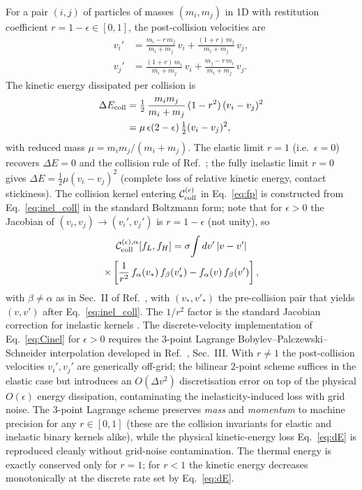 \documentclass[aps,pre,twocolumn,superscriptaddress,longbibliography,floatfix]{revtex4-2}
\begin{document}
For a pair $(i,j)$ of particles of masses $(m_i, m_j)$ in 1D
with restitution coefficient $r=1-\epsilon\in[0,1]$, the
post-collision velocities are
\begin{align}
v_i' &= \frac{m_i - r\,m_j}{m_i+m_j}\,v_i
       + \frac{(1+r)\,m_j}{m_i+m_j}\,v_j, \\
v_j' &= \frac{(1+r)\,m_i}{m_i+m_j}\,v_i
       + \frac{m_j - r\,m_i}{m_i+m_j}\,v_j.
\label{eq:inel_coll}
\end{align}
The kinetic energy dissipated per collision is
\begin{align}
\Delta E_{\rm coll} &= \tfrac{1}{2}\,
\frac{m_i m_j}{m_i+m_j}\,(1-r^2)\,(v_i-v_j)^2
\notag\\
&= \mu\,\epsilon(2-\epsilon)\,\tfrac12(v_i-v_j)^2,
\label{eq:dE}
\end{align}
with reduced mass $\mu = m_i m_j/(m_i+m_j)$. The elastic
limit $r=1$ (i.e.\ $\epsilon=0$) recovers $\Delta E=0$ and the
collision rule of Ref.~\cite{PaperIV}; the fully inelastic
limit $r=0$ gives $\Delta E = \tfrac12\mu(v_i-v_j)^2$
(complete loss of relative kinetic energy, contact stickiness).
The collision kernel entering $\mathcal{C}_{\rm coll}^{(\epsilon)}$
in Eq.~\eqref{eq:fp} is constructed from
Eq.~\eqref{eq:inel_coll} in the standard Boltzmann form;
note that for $\epsilon>0$ the Jacobian of
$(v_i,v_j)\to(v_i',v_j')$ is $r=1-\epsilon$ (not unity), so
\begin{multline}
\mathcal{C}_{\rm coll}^{(\epsilon),\alpha}[f_L,f_H]
= \sigma\!\int dv'\,|v-v'|\\
\times\left[\frac{1}{r^2}\,f_\alpha(v_*)\,f_\beta(v'_*)
            - f_\alpha(v)\,f_\beta(v')\right],
\label{eq:Cinel}
\end{multline}
with $\beta\neq\alpha$ as in Sec.~II of Ref.~\cite{PaperIV},
with $(v_*,v'_*)$ the pre-collision pair that yields $(v,v')$
after Eq.~\eqref{eq:inel_coll}. The $1/r^2$ factor is the
standard Jacobian correction for inelastic kernels
\cite{BrilliantovPoschel}. The discrete-velocity implementation
of Eq.~\eqref{eq:Cinel} for $\epsilon>0$ requires the
$3$-point Lagrange Bobylev--Palczewski--Schneider interpolation
developed in Ref.~\cite{PaperV}, Sec.~III. With $r\neq 1$ the
post-collision velocities $v_i', v_j'$ are generically off-grid;
the bilinear $2$-point scheme suffices in the elastic case but
introduces an $O(\Delta v^2)$ discretisation error on top of
the physical $O(\epsilon)$ energy dissipation, contaminating
the inelasticity-induced loss with grid noise. The $3$-point
Lagrange scheme preserves \emph{mass} and \emph{momentum} to
machine precision for any $r\in[0,1]$ (these are the
collision invariants for elastic and inelastic
binary kernels alike), while the physical kinetic-energy
loss Eq.~\eqref{eq:dE} is reproduced cleanly without
grid-noise contamination. The thermal energy is exactly
conserved only for $r=1$; for $r<1$ the kinetic energy
decreases monotonically at the discrete rate set by
Eq.~\eqref{eq:dE}.
\end{document}
